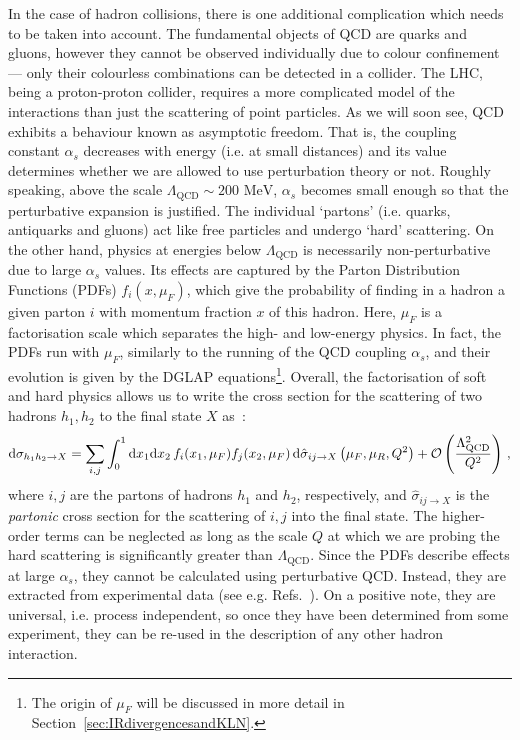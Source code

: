 \documentclass[main.tex]{subfiles}
\begin{document}
In the case of hadron collisions, there is one additional complication which needs to be taken into account. The fundamental objects of QCD are quarks and gluons, however they cannot be observed individually due to colour confinement --- only their colourless combinations can be detected in a collider. The LHC, being a proton-proton collider, requires a more complicated model of the interactions than just the scattering of point particles. As we will soon see, QCD exhibits a behaviour known as asymptotic freedom. That is, the coupling constant $\alpha_s$ decreases with energy (i.e. at small distances) and its value determines whether we are allowed to use perturbation theory or not. Roughly speaking, above the scale $\Lambda_\text{QCD} \sim 200 \text{ MeV}$, $\alpha_s$ becomes small enough so that the perturbative expansion is justified. The individual `partons' (i.e. quarks, antiquarks and gluons) act like free particles and undergo `hard' scattering\cite{PhysRevLett.23.1415}. On the other hand, physics at energies below $\Lambda_\text{QCD}$ is necessarily non-perturbative due to large $\alpha_s$ values. Its effects are captured by the Parton Distribution Functions (PDFs) $f_i(x, \mu_F)$, which give the probability of finding in a hadron a given parton $i$ with momentum fraction $x$ of this hadron. Here, $\mu_F$ is a factorisation scale which separates the high- and low-energy physics. In fact, the PDFs run with $\mu_F$, similarly to the running of the QCD coupling $\alpha_s$, and their evolution is given by the DGLAP equations\footnote{The origin of $\mu_F$ will be discussed in more detail in Section~\ref{sec:IRdivergencesandKLN}.}. Overall, the factorisation of soft and hard physics allows us to write the cross section for the scattering of two hadrons $h_1, h_2$ to the final state $X$ as~\cite{Collins:1989gx}:
\begin{equation} \label{eq:factorisation}
    \mathrm{d} \sigma_{h_1 h_2 \to X} = \sum_{i,j} \int_0^1 \mathrm{d} x_1 \mathrm{d} x_2 \, f_i(x_1, \mu_F) f_j(x_2, \mu_F) \, \mathrm{d} \hat{\sigma}_{ij \to X}\left(\mu_F, \mu_R, Q^2\right) + \mathcal{O}\left(\frac{\Lambda_\text{QCD}^2}{Q^2}\right)\,,
\end{equation}
where $i, j$ are the partons of hadrons $h_1$ and $h_2$, respectively, and $\hat{\sigma}_{ij \to X}$ is the \textit{partonic} cross section for the scattering of $i,j$ into the final state. The higher-order terms can be neglected as long as the scale $Q$ at which we are probing the hard scattering is significantly greater than $\Lambda_{\text{QCD}}$. Since the PDFs describe effects at large $\alpha_s$, they cannot be calculated using perturbative QCD. Instead, they are extracted from experimental data (see e.g. Refs.~\cite{H1:2015ubc, Alekhin:2017kpj, Hou:2019efy, NNPDF:2021uiq, Buckley:2014ana}). On a positive note, they are universal, i.e. process independent, so once they have been determined from some experiment, they can be re-used in the description of any other hadron interaction.
\end{document}
